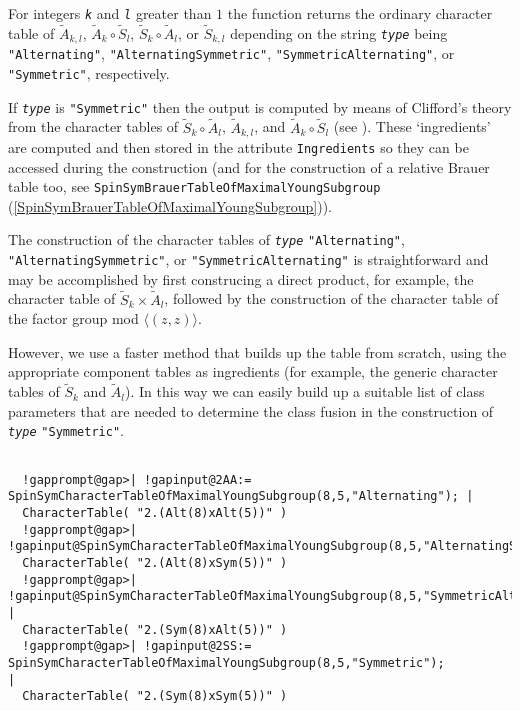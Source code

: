 \documentclass[a4paper,11pt]{report}
\begin{document}
{{{ For integers \mbox{\texttt{\mdseries\slshape k}} and \mbox{\texttt{\mdseries\slshape l}} greater than $1$ the function returns the ordinary character table of $\tilde{A}_{k,l}$, $\tilde{A}_k\circ\tilde{S}_l$, $\tilde{S}_k\circ\tilde{A}_l$, or $\tilde{S}_{k,l}$ depending on the string \mbox{\texttt{\mdseries\slshape type}} being \texttt{"Alternating"}, \texttt{"AlternatingSymmetric"}, \texttt{"SymmetricAlternating"}, or \texttt{"Symmetric"}, respectively.

 If \mbox{\texttt{\mdseries\slshape type}} is \texttt{"Symmetric"} then the output is computed by means of Clifford's theory from the character
tables of $\tilde{S}_k\circ\tilde{A}_l$, $\tilde{A}_{k,l}$, and $\tilde{A}_k\circ\tilde{S}_l$ (see \cite[Section 5.2]{Maas2011}). These `ingredients' are computed and then stored in the attribute \texttt{Ingredients} so they can be accessed during the construction (and for the construction of a
relative Brauer table too, see \texttt{SpinSymBrauerTableOfMaximalYoungSubgroup} (\ref{SpinSymBrauerTableOfMaximalYoungSubgroup})). 

 The construction of the character tables of \mbox{\texttt{\mdseries\slshape type}} \texttt{"Alternating"}, \texttt{"AlternatingSymmetric"}, or \texttt{"SymmetricAlternating"} is straightforward and may be accomplished by first construcing a direct
product, for example, the character table of $\tilde{S}_k\times\tilde{A}_{l}$, followed by the construction of the character table of the factor group mod $\langle(z,z)\rangle$.

 However, we use a faster method that builds up the table from scratch, using
the appropriate component tables as ingredients (for example, the generic
character tables of  $\tilde{S}_k$ and  $\tilde{A}_l$). In this way we can easily build up a suitable list of class parameters that
are needed to determine the class fusion in the construction of \mbox{\texttt{\mdseries\slshape type}} \texttt{"Symmetric"}. }

 
\begin{Verbatim}[commandchars=!@|,fontsize=\small,frame=single,label=Example]
  
  !gapprompt@gap>| !gapinput@2AA:= SpinSymCharacterTableOfMaximalYoungSubgroup(8,5,"Alternating"); |
  CharacterTable( "2.(Alt(8)xAlt(5))" )
  !gapprompt@gap>| !gapinput@SpinSymCharacterTableOfMaximalYoungSubgroup(8,5,"AlternatingSymmetric");|
  CharacterTable( "2.(Alt(8)xSym(5))" )
  !gapprompt@gap>| !gapinput@SpinSymCharacterTableOfMaximalYoungSubgroup(8,5,"SymmetricAlternating");     |
  CharacterTable( "2.(Sym(8)xAlt(5))" )
  !gapprompt@gap>| !gapinput@2SS:= SpinSymCharacterTableOfMaximalYoungSubgroup(8,5,"Symmetric");           |
  CharacterTable( "2.(Sym(8)xSym(5))" )
  

\end{Verbatim}}}
\end{document}
